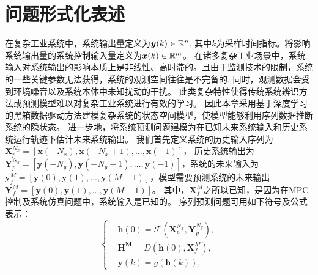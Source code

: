 \section{问题形式化表述}
\label{sec:formulate}
在复杂工业系统中，系统输出量定义为$\boldsymbol y(k) \in \mathbb{R}^n$,
其中$k$为采样时间指标。将影响系统输出量的系统控制输入量定义为$\boldsymbol x(k)\in \mathbb{R}^m$。
在诸多复杂工业场景中，系统输入对系统输出的影响本质上是非线性、高时滞的。且由于监测技术的限制，系统的一些关键参数无法获得，系统的观测空间往往是不完备的,
同时，观测数据会受到环境噪音以及系统本体中未知扰动的干扰。
此类复杂特性使得传统系统辨识方法\cite{larsson2002identification}或预测模型\cite{box2015time}难以对复杂工业系统进行有效的学习。
因此本章采用基于深度学习的黑箱数据驱动方法建模复杂系统的状态空间模型，使模型能够利用序列数据推断系统的隐状态。
进一步地，将系统预测问题建模为在已知未来系统输入和历史系统运行轨迹下估计未来系统输出。
我们首先定义系统的历史输入序列为 $\boldsymbol X_p^{N_x}=[\boldsymbol x(-N_x),\boldsymbol x(-N_x+1), \dots, \boldsymbol x(-1)]$， 历史系统输出为 
$\boldsymbol Y_p^{N_y}=[\boldsymbol y(-N_y),\boldsymbol y(-N_y+1),\dots, \boldsymbol y(-1)]$，系统的未来输入为 $\boldsymbol y_f^{M}=[\boldsymbol y(0),\boldsymbol y(1),\dots,\boldsymbol y(M-1)]$，模型需要预测系统的未来输出$\boldsymbol Y_f^{M}=[\boldsymbol y(0),\boldsymbol y(1),\dots,\boldsymbol y(M-1)]$。
其中，$\boldsymbol X_f^{M}$之所以已知，是因为在MPC控制及系统仿真问题中，系统输入是已知的。
序列预测问题可用如下符号及公式表示：
\begin{equation}
\label{equ:discrete_seq2seq}
\left\{
\begin{aligned}
&\boldsymbol{h}(0) = \mathcal{F}(\boldsymbol X_p^{N_x}, \boldsymbol{Y}_p^{N_y}), \\
&\boldsymbol{H^M} = D(\boldsymbol{h}(0), \boldsymbol {X}_f^{M}),\\
&\boldsymbol{y}(k) = g(\boldsymbol{h}(k)),
\end{aligned}
\right.
\end{equation}

